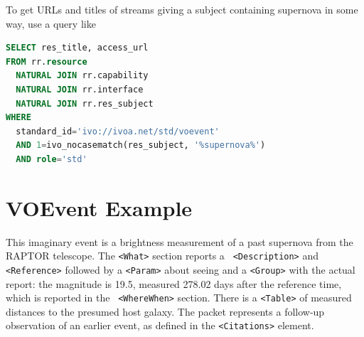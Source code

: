 \documentclass[11pt,a4paper]{ivoa}
\begin{document}
To get URLs and titles of streams giving a subject containing supernova
in some way, use a query like

\begin{lstlisting}[language=SQL]
SELECT res_title, access_url
FROM rr.resource
  NATURAL JOIN rr.capability
  NATURAL JOIN rr.interface
  NATURAL JOIN rr.res_subject
WHERE 
  standard_id='ivo://ivoa.net/std/voevent'
  AND 1=ivo_nocasematch(res_subject, '%supernova%')
  AND role='std'
\end{lstlisting}

\section{VOEvent Example}
\label{sec:4}
This imaginary event is a brightness measurement of a past supernova from the 
RAPTOR \citep{bib10} telescope. The {\tt <What>} section reports a {\tt 
<Description>} and {\tt <Reference>} followed by a {\tt <Param>} about seeing 
and a {\tt <Group>} with the actual report: the magnitude is 19.5, measured 
278.02 days after the reference time, which is reported in the {\tt 
<WhereWhen>} section. There is a {\tt <Table>} of measured distances to the 
presumed host galaxy. The packet represents a follow-up observation of an 
earlier event, as defined in the {\tt <Citations>} element. 
\end{document}
